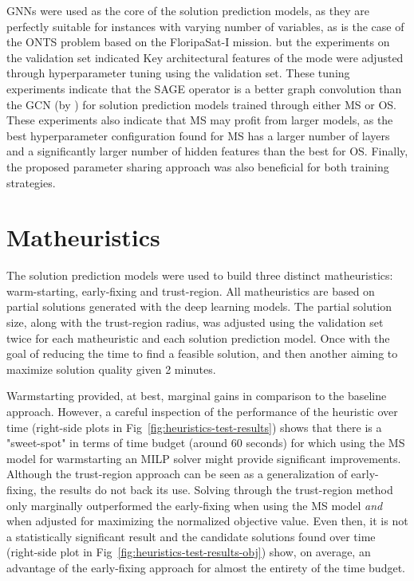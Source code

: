 GNNs were used as the core of the solution prediction models, as they are perfectly suitable for instances with varying number of variables, as is the case of the ONTS problem based on the FloripaSat-I mission.
but the experiments on the validation set indicated
Key architectural features of the mode were adjusted through hyperparameter tuning using the validation set.
These tuning experiments indicate that the SAGE operator is a better graph convolution than the GCN (by ) for solution prediction models trained through either MS or OS.
These experiments also indicate that MS may profit from larger models, as the best hyperparameter configuration found for MS has a larger number of layers and a significantly larger number of hidden features than the best for OS.
Finally, the proposed parameter sharing approach was also beneficial for both training strategies. 

\section{Matheuristics}

The solution prediction models were used to build three distinct matheuristics: warm-starting, early-fixing and trust-region.
All matheuristics are based on partial solutions generated with the deep learning models.
The partial solution size, along with the trust-region radius, was adjusted using the validation set twice for each matheuristic and each solution prediction model.
Once with the goal of reducing the time to find a feasible solution, and then another aiming to maximize solution quality given 2 minutes.

Warmstarting provided, at best, marginal gains in comparison to the baseline approach.
However, a careful inspection of the performance of the heuristic over time (right-side plots in Fig~\ref{fig:heuristics-test-results}) shows that there is a "sweet-spot" in terms of time budget (around 60 seconds) for which using the MS model for warmstarting an MILP solver might provide significant improvements.
Although the trust-region approach can be seen as a generalization of early-fixing, the results do not back its use.
Solving through the trust-region method only marginally outperformed the early-fixing when using the MS model \emph{and} when adjusted for maximizing the normalized objective value.
Even then, it is not a statistically significant result and the candidate solutions found over time (right-side plot in Fig~\ref{fig:heuristics-test-results-obj}) show, on average, an advantage of the early-fixing approach for almost the entirety of the time budget.

